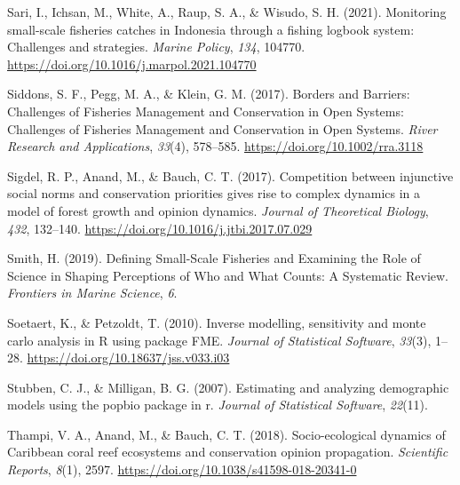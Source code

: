 \documentclass[
  12pt,
]{article}
\newlength{\cslhangindent}
\newlength{\cslentryspacingunit} %
\newenvironment{CSLReferences}[2] %
 {%
  \setlength{\parindent}{0pt}
  \ifodd #1
  \let\oldpar\par
  \def\par{\hangindent=\cslhangindent\oldpar}
  \fi
  \setlength{\parskip}{#2\cslentryspacingunit}
 }%
 {}
\begin{document}
\begin{CSLReferences}{1}{2}
\leavevmode{}%
Sari, I., Ichsan, M., White, A., Raup, S. A., \& Wisudo, S. H. (2021). Monitoring small-scale fisheries catches in {Indonesia} through a fishing logbook system: {Challenges} and strategies. \emph{Marine Policy}, \emph{134}, 104770. \url{https://doi.org/10.1016/j.marpol.2021.104770}

\leavevmode{}%
Siddons, S. F., Pegg, M. A., \& Klein, G. M. (2017). Borders and {Barriers}: Challenges of {Fisheries} {Management} and {Conservation} in {Open} {Systems}: {Challenges} of {Fisheries} {Management} and {Conservation} in {Open} {Systems}. \emph{River Research and Applications}, \emph{33}(4), 578--585. \url{https://doi.org/10.1002/rra.3118}

\leavevmode{}%
Sigdel, R. P., Anand, M., \& Bauch, C. T. (2017). Competition between injunctive social norms and conservation priorities gives rise to complex dynamics in a model of forest growth and opinion dynamics. \emph{Journal of Theoretical Biology}, \emph{432}, 132--140. \url{https://doi.org/10.1016/j.jtbi.2017.07.029}

\leavevmode{}%
Smith, H. (2019). Defining {Small}-{Scale} {Fisheries} and {Examining} the {Role} of {Science} in {Shaping} {Perceptions} of {Who} and {What} {Counts}: {A} {Systematic} {Review}. \emph{Frontiers in Marine Science}, \emph{6}.

\leavevmode{}%
Soetaert, K., \& Petzoldt, T. (2010). Inverse modelling, sensitivity and monte carlo analysis in {R} using package {FME}. \emph{Journal of Statistical Software}, \emph{33}(3), 1--28. \url{https://doi.org/10.18637/jss.v033.i03}

\leavevmode{}%
Stubben, C. J., \& Milligan, B. G. (2007). Estimating and analyzing demographic models using the popbio package in r. \emph{Journal of Statistical Software}, \emph{22}(11).

\leavevmode{}%
Thampi, V. A., Anand, M., \& Bauch, C. T. (2018). Socio-ecological dynamics of {Caribbean} coral reef ecosystems and conservation opinion propagation. \emph{Scientific Reports}, \emph{8}(1), 2597. \url{https://doi.org/10.1038/s41598-018-20341-0}


\end{CSLReferences}
\end{document}

